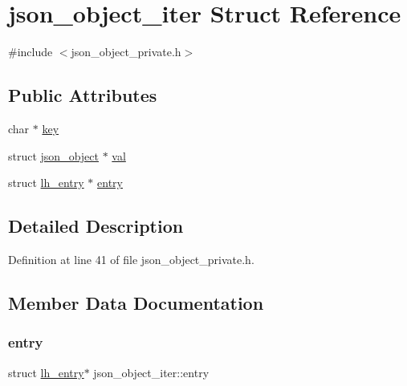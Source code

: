 \hypertarget{structjson__object__iter}{}\section{json\+\_\+object\+\_\+iter Struct Reference}
\label{structjson__object__iter}


{\ttfamily \#include $<$json\+\_\+object\+\_\+private.\+h$>$}

\subsection*{Public Attributes}
\begin{DoxyCompactItemize}
\item 
char $\ast$ \hyperlink{structjson__object__iter_a0b76228b3a039075e9d84f88fa72ff53}{key}
\item 
struct \hyperlink{structjson__object}{json\+\_\+object} $\ast$ \hyperlink{structjson__object__iter_aaae14a8d17aacddacb0a57234e0a4491}{val}
\item 
struct \hyperlink{structlh__entry}{lh\+\_\+entry} $\ast$ \hyperlink{structjson__object__iter_a64e326f050826c644c02ed5bcd214faa}{entry}
\end{DoxyCompactItemize}


\subsection{Detailed Description}


Definition at line 41 of file json\+\_\+object\+\_\+private.\+h.



\subsection{Member Data Documentation}
\mbox{\label{structjson__object__iter_a64e326f050826c644c02ed5bcd214faa}} 
\subsubsection{\texorpdfstring{entry}{entry}}
{\footnotesize\ttfamily struct \hyperlink{structlh__entry}{lh\+\_\+entry}$\ast$ json\+\_\+object\+\_\+iter\+::entry}



